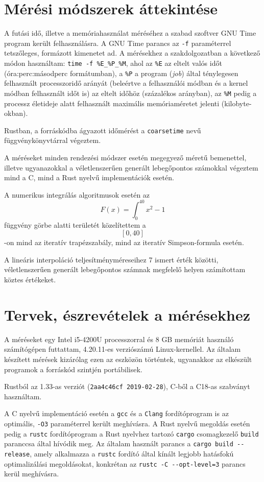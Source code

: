 
\section{Mérési módszerek áttekintése}

A futási idő, illetve a memóriahasználat méréséhez a szabad szoftver GNU Time program került felhasználásra. A GNU Time parancs az \lstinline{-f} paraméterrel tetszőleges, formázott kimenetet ad. A mérésekhez a szakdolgozatban a következő módon használtam: \lstinline{time -f %E_%P_%M}, ahol az \lstinline{%E} az eltelt valós időt (óra:perc:másodperc formátumban), a \lstinline{%P} a program (\textit{job}) által ténylegesen felhasznált processzoridő arányát (beleértve a felhasználói módban és a kernel módban felhasznált időt is) az eltelt időhöz (százalékos arányban), az \lstinline{%M} pedig a processz életideje alatt felhasznált maximális memóriaméretet jelenti (kilobyte-okban).

Rustban, a forráskódba ágyazott időmérést a \texttt{coarsetime} nevű függvénykönyvtárral végeztem.

A méréseket minden rendezési módszer esetén megegyező méretű bemenettel, illetve ugyanazokkal a véletlenszerűen generált lebegőpontos számokkal végeztem mind a C, mind a Rust nyelvű implementációk esetén.

A numerikus integrálás algoritmusok esetén az \[ F(x) = \int_0^{40} x^2 - 1 \] függvény görbe alatti területét közelítettem a \[\left[0, 40\right]\]-on mind az iteratív trapézszabály, mind az iteratív Simpson-formula esetén.

A lineáris interpoláció teljesítményméreseihez 7 ismert érték közötti, véletlenszerűen generált lebegőpontos számnak megfelelő helyen számítottam köztes értékeket.

\section{Tervek, észrevételek a mérésekhez}

A méréseket egy Intel i5-4200U processzorral és 8 GB memóriát használó számítógépen futtattam, 4.20.11-es verziószámú Linux-kernellel. Az általam készített mérések kizárólag ezen az eszközön történtek, ugyanakkor az elkészült programok a forráskód szintjén portábilisek.

Rustból az 1.33-as verziót (\lstinline{2aa4c46cf 2019-02-28}), C-ből a C18-as szabványt használtam.

A C nyelvű implementáció esetén a \lstinline{gcc} és a \lstinline{Clang} fordítóprogram is az optimális, \lstinline{-O3} paraméterrel került meghívásra. A Rust nyelvű megoldás esetén pedig a \lstinline{rustc} fordítóprogram a Rust nyelvhez tartozó \lstinline{cargo} csomagkezelő \lstinline{build} paranccsa által hívódik meg. Az általam használt parancs a \lstinline{cargo build --release}, amely alkalmazza a \lstinline{rustc} fordító által kínált legjobb hatásfokú optimalizálási megoldásokat, konkrétan az \lstinline{rustc -C --opt-level=3} parancs kerül meghívásra.
